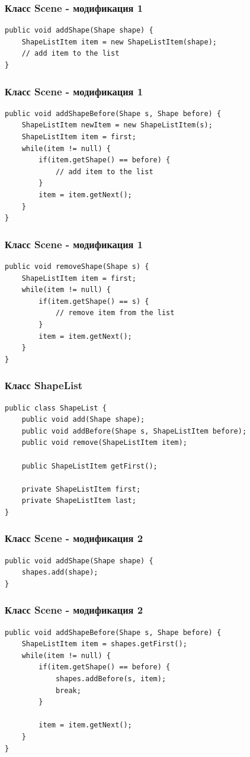 \documentclass[handout]{beamer}
\begin{document}
\begin{frame}[fragile]
\frametitle{Класс Scene - модификация 1}
\begin{lstlisting}
public void addShape(Shape shape) {
    ShapeListItem item = new ShapeListItem(shape);
    // add item to the list
}
\end{lstlisting}
\end{frame}


\begin{frame}[fragile]
\frametitle{Класс Scene - модификация 1}
\begin{lstlisting}
public void addShapeBefore(Shape s, Shape before) {
    ShapeListItem newItem = new ShapeListItem(s);
    ShapeListItem item = first;
    while(item != null) {
        if(item.getShape() == before) {
            // add item to the list
        }
        item = item.getNext();
    }
}
\end{lstlisting}
\end{frame}


\begin{frame}[fragile]
\frametitle{Класс Scene - модификация 1}
\begin{lstlisting}
public void removeShape(Shape s) {
    ShapeListItem item = first;
    while(item != null) {
        if(item.getShape() == s) {
            // remove item from the list
        }
        item = item.getNext();
    }
}
\end{lstlisting}
\end{frame}


\begin{frame}[fragile]
\frametitle{Класс ShapeList}
\begin{lstlisting}
public class ShapeList {
    public void add(Shape shape);
    public void addBefore(Shape s, ShapeListItem before);
    public void remove(ShapeListItem item);

    public ShapeListItem getFirst();

    private ShapeListItem first;
    private ShapeListItem last;
}
\end{lstlisting}
\end{frame}


\begin{frame}[fragile]
\frametitle{Класс Scene - модификация 2}
\begin{lstlisting}
public void addShape(Shape shape) {
    shapes.add(shape);
}
\end{lstlisting}
\end{frame}


\begin{frame}[fragile]
\frametitle{Класс Scene - модификация 2}
\begin{lstlisting}
public void addShapeBefore(Shape s, Shape before) {
    ShapeListItem item = shapes.getFirst();
    while(item != null) {
        if(item.getShape() == before) {
            shapes.addBefore(s, item);
            break;
        }

        item = item.getNext();
    }
}
\end{lstlisting}
\end{frame}
\end{document}
